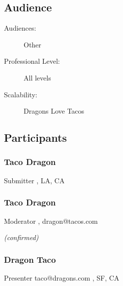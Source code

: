 \documentclass{report}
\begin{document}
              \subsection*{Audience}
                \begin{description}
                  \item [Audiences:]Other~
                  \item[Professional Level:]All levels~
                \item[Scalability:] Dragons Love Tacos

							
              \end{description}
            \subsection*{Participants}
              \subsubsection*{ Taco Dragon }
              Submitter\newline
              \newline
              , LA, CA
              \newline
              
              
              

              


              
                \subsubsection*{ Taco Dragon }
                Moderator\newline
                \newline
                , 
                \newline
                dragon@tacos.com\newline
                
                

                
                \emph{ (confirmed) }
              

              
                \subsubsection*{ Dragon Taco }
                Presenter\newline
                taco@dragons.com\newline
                , SF, CA
                \newline
                
\end{document}
